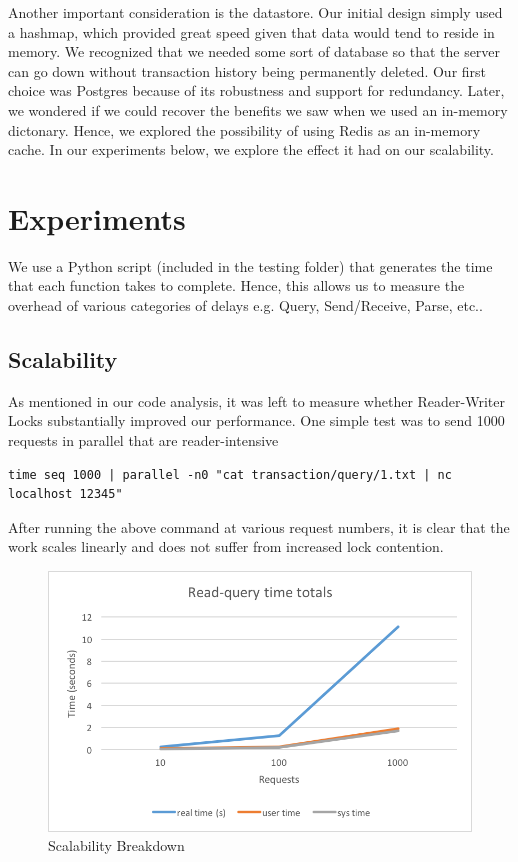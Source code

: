 \documentclass[titlepage, 11pt]{article}
\newcommand\0{\mathbf{0}}
\newcommand\<{\langle}
\renewcommand\>{\rangle}
\begin{document}
Another important consideration is the datastore. Our initial design simply used a hashmap, which provided great speed given that data would tend to reside in memory. We recognized that we needed some sort of database so that the server can go down without transaction history being permanently deleted. Our first choice was Postgres because of its robustness and support for redundancy. Later, we wondered if we could recover the benefits we saw when we used an in-memory dictonary. Hence, we explored the possibility of using Redis as an in-memory cache. In our experiments below, we explore the effect it had on our scalability.

\section{Experiments}


We use a Python script (included in the testing folder) that generates the time that each function takes to complete. Hence, this allows us to measure the overhead of various categories of delays e.g. Query, Send/Receive, Parse, etc.. 

\subsection{Scalability}

As mentioned in our code analysis, it was left to measure whether Reader-Writer Locks substantially improved our performance. One simple test was to send 1000 requests in parallel that are reader-intensive

\begin{lstlisting}
time seq 1000 | parallel -n0 "cat transaction/query/1.txt | nc localhost 12345"
\end{lstlisting}

After running the above command at various request numbers, it is clear that the work scales linearly and does not suffer from increased lock contention.

\begin{figure}[H]
\centering
\includegraphics[width=\linewidth]{read-query-times.png}
\caption{Scalability Breakdown}
\end{figure}
\end{document}
